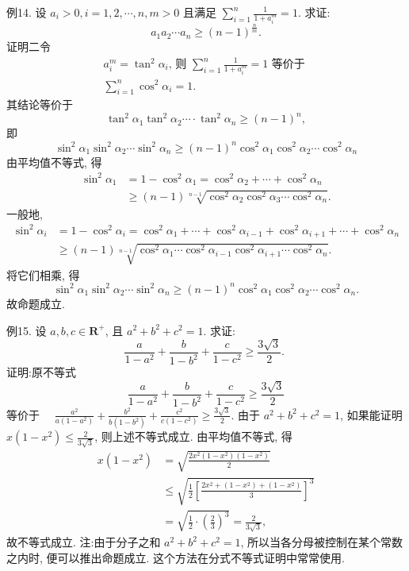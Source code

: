 例14. 设 $a_i>0, i=1,2, \cdots, n, m>0$ 且满足 $\sum_{i=1}^n \frac{1}{1+a_i^m}=1$. 求证:
$$
a_1 a_2 \cdots a_n \geqslant(n-1)^{\frac{n}{m}} .
$$
证明二令 
$$
\begin{gathered}
a_i^m=\tan ^2 \alpha_i \text {, 则 } \sum_{i=1}^n \frac{1}{1+a_i^m}=1 \text { 等价于 } \\
\sum_{i=1}^n \cos ^2 \alpha_i=1 .
\end{gathered}
$$
其结论等价于
$$
\tan ^2 \alpha_1 \tan ^2 \alpha_2 \cdots \cdot \tan ^2 \alpha_n \geqslant(n-1)^n,
$$
即
$$
\sin ^2 \alpha_1 \sin ^2 \alpha_2 \cdots \sin ^2 \alpha_n \geqslant(n-1)^n \cos ^2 \alpha_1 \cos ^2 \alpha_2 \cdots \cos ^2 \alpha_n
$$
由平均值不等式, 得
$$
\begin{aligned}
\sin ^2 \alpha_1 & =1-\cos ^2 \alpha_1=\cos ^2 \alpha_2+\cdots+\cos ^2 \alpha_n \\
& \geqslant(n-1) \sqrt[n-1]{\cos ^2 \alpha_2 \cos ^2 \alpha_3 \cdots \cos ^2 \alpha_n} .
\end{aligned}
$$
一般地,
$$
\begin{aligned}
\sin ^2 \alpha_i & =1-\cos ^2 \alpha_i=\cos ^2 \alpha_1+\cdots+\cos ^2 \alpha_{i-1}+\cos ^2 \alpha_{i+1}+\cdots+\cos ^2 \alpha_n \\
& \geqslant(n-1) \sqrt[n-1]{\cos ^2 \alpha_1 \cdots \cos ^2 \alpha_{i-1} \cos ^2 \alpha_{i+1} \cdots \cos ^2 \alpha_n} .
\end{aligned}
$$
将它们相乘, 得
$$
\sin ^2 \alpha_1 \sin ^2 \alpha_2 \cdots \sin ^2 \alpha_n \geqslant(n-1)^n \cos ^2 \alpha_1 \cos ^2 \alpha_2 \cdots \cos ^2 \alpha_n .
$$
故命题成立.



例15. 设 $a, b, c \in \mathbf{R}^{+}$, 且 $a^2+b^2+c^2=1$. 求证:
$$
\frac{a}{1-a^2}+\frac{b}{1-b^2}+\frac{c}{1-c^2} \geqslant \frac{3 \sqrt{3}}{2} \text {. }
$$
证明:原不等式
$$
\frac{a}{1-a^2}+\frac{b}{1-b^2}+\frac{c}{1-c^2} \geqslant \frac{3 \sqrt{3}}{2}
$$
等价于 $\quad \frac{a^2}{a\left(1-a^2\right)}+\frac{b^2}{b\left(1-b^2\right)}+\frac{c^2}{c\left(1-c^2\right)} \geqslant \frac{3 \sqrt{3}}{2}$.
由于 $a^2+b^2+c^2=1$, 如果能证明 $x\left(1-x^2\right) \leqslant \frac{2}{3 \sqrt{3}}$, 则上述不等式成立.
由平均值不等式, 得
$$
\begin{aligned}
x\left(1-x^2\right) & =\sqrt{\frac{2 x^2\left(1-x^2\right)\left(1-x^2\right)}{2}} \\
& \leqslant \sqrt{\frac{1}{2}\left[\frac{2 x^2+\left(1-x^2\right)+\left(1-x^2\right)}{3}\right]^3} \\
& =\sqrt{\frac{1}{2} \cdot\left(\frac{2}{3}\right)^3}=\frac{2}{3 \sqrt{3}},
\end{aligned}
$$
故不等式成立.
注:由于分子之和 $a^2+b^2+c^2=1$, 所以当各分母被控制在某个常数之内时, 便可以推出命题成立.
这个方法在分式不等式证明中常常使用.



